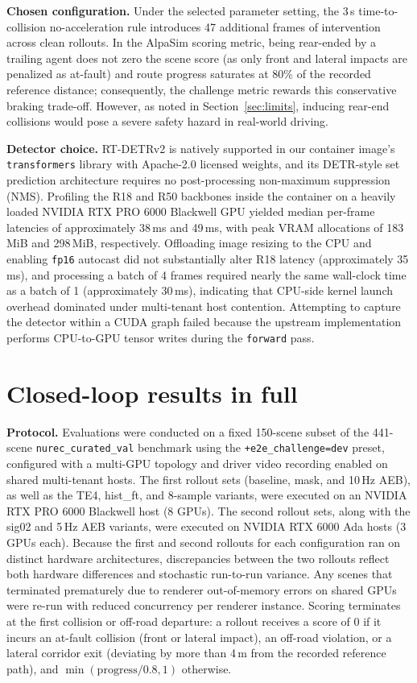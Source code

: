 \textbf{Chosen configuration.} Under the selected parameter setting, the 3\,s time-to-collision no-acceleration rule introduces 47 additional frames of intervention across clean rollouts. In the AlpaSim scoring metric, being rear-ended by a trailing agent does not zero the scene score (as only front and lateral impacts are penalized as at-fault) and route progress saturates at 80\% of the recorded reference distance; consequently, the challenge metric rewards this conservative braking trade-off. However, as noted in Section~\ref{sec:limits}, inducing rear-end collisions would pose a severe safety hazard in real-world driving.

\textbf{Detector choice.} RT-DETRv2 is natively supported in our container image's \texttt{transformers} library with Apache-2.0 licensed weights, and its DETR-style set prediction architecture requires no post-processing non-maximum suppression (NMS). Profiling the R18 and R50 backbones inside the container on a heavily loaded NVIDIA RTX PRO 6000 Blackwell GPU yielded median per-frame latencies of approximately 38\,ms and 49\,ms, with peak VRAM allocations of 183\,MiB and 298\,MiB, respectively. Offloading image resizing to the CPU and enabling \texttt{fp16} autocast did not substantially alter R18 latency (approximately 35\,ms), and processing a batch of 4 frames required nearly the same wall-clock time as a batch of 1 (approximately 30\,ms), indicating that CPU-side kernel launch overhead dominated under multi-tenant host contention. Attempting to capture the detector within a CUDA graph failed because the upstream implementation performs CPU-to-GPU tensor writes during the \texttt{forward} pass.

\FloatBarrier
\section{Closed-loop results in full}
\label{app:closed}
\textbf{Protocol.} Evaluations were conducted on a fixed 150-scene subset of the 441-scene \texttt{nurec\_curated\_val} benchmark using the \texttt{+e2e\_challenge=dev} preset, configured with a multi-GPU topology and driver video recording enabled on shared multi-tenant hosts. The first rollout sets (baseline, mask, and 10\,Hz AEB), as well as the TE4, hist\_ft, and 8-sample variants, were executed on an NVIDIA RTX PRO 6000 Blackwell host (8 GPUs). The second rollout sets, along with the sig02 and 5\,Hz AEB variants, were executed on NVIDIA RTX 6000 Ada hosts (3 GPUs each). Because the first and second rollouts for each configuration ran on distinct hardware architectures, discrepancies between the two rollouts reflect both hardware differences and stochastic run-to-run variance. Any scenes that terminated prematurely due to renderer out-of-memory errors on shared GPUs were re-run with reduced concurrency per renderer instance. Scoring terminates at the first collision or off-road departure: a rollout receives a score of 0 if it incurs an at-fault collision (front or lateral impact), an off-road violation, or a lateral corridor exit (deviating by more than 4\,m from the recorded reference path), and $\min(\mathrm{progress}/0.8,1)$ otherwise.


